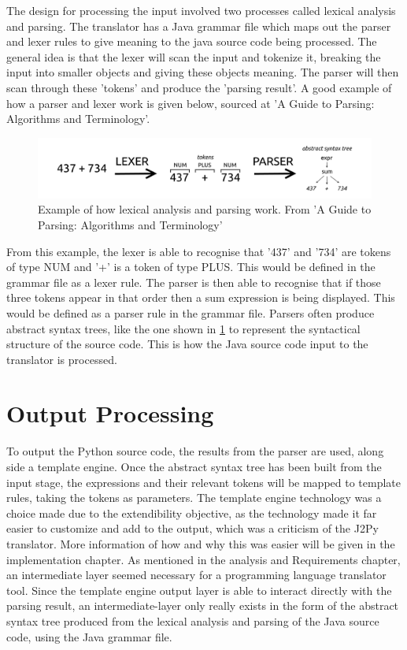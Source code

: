 \documentclass{l4proj}
\begin{document}
The design for processing the input involved two processes called lexical analysis and parsing. The translator has a Java grammar file which maps out the parser and lexer rules to give meaning to the java source code being processed. The general idea is that the lexer will scan the input and tokenize it, breaking the input into smaller objects and giving these objects meaning. The parser will then scan through these 'tokens' and produce the 'parsing result'. A good example of how a parser and lexer work is given below, sourced at 'A Guide to Parsing: Algorithms and Terminology'.

\begin{figure}[htb]
    \centering
    \includegraphics[width=1\linewidth]{images/parserLexer.png}
        \caption{Example of how lexical analysis and parsing work. From 'A Guide to Parsing: Algorithms and Terminology'
    }
    \label{fig:parserLexer} 
\end{figure}

From this example, the lexer is able to recognise that '437' and '734' are tokens of type NUM and '+' is a token of type PLUS. This would be defined in the grammar file as a lexer rule.
The parser is then able to recognise that if those three tokens appear in that order then a sum expression is being displayed. This would be defined as a parser rule in the grammar file.
Parsers often produce abstract syntax trees, like the one shown in \ref{fig:parserLexer} to represent the syntactical structure of the source code. This is how the Java source code input to the translator is processed.

\section{Output Processing}
To output the Python source code, the results from the parser are used, along side a template engine. Once the abstract syntax tree has been built from the input stage, the expressions and their relevant tokens will be mapped to template rules, taking the tokens as parameters. The template engine technology was a choice made due to the extendibility objective, as the technology made it far easier to customize and add to the output, which was a criticism of the J2Py translator. More information of how and why this was easier will be given in the implementation chapter. As mentioned in the analysis and Requirements chapter, an intermediate layer seemed necessary for a programming language translator tool. Since the template engine output layer is able to interact directly with the parsing result, an intermediate-layer only really exists in the form of the abstract syntax tree produced from the lexical analysis and parsing of the Java source code, using the Java grammar file.
\end{document}
